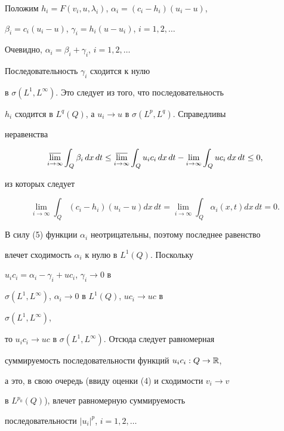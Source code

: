 


\begin{pf} 


Положим $h_i=F(v_i,u,\lambda_i)$, $\alpha_i=(c_i-h_i)(u_i-u)$, 


$\beta_i=c_i(u_i-u)$, $\gamma_i=h_i(u-u_i)$, $i=1,2,\dotsc$ 


Очевидно, $\alpha_i=\beta_i+\gamma_i$, $i=1,2,\dotsc$ 


Последовательность $\gamma_i$ сходится к нулю 


в $\sigma(L^1,L^\infty)$. Это следует из того, что последовательность 


$h_i$ сходится в $L^q(Q)$, а $u_i\to u$ в $\sigma(L^p,L^q)$. Справедливы 


неравенства 


$$ 


\underset{i\to\infty}{\varlimsup}\int_Q \beta_i\,d x\,d t\le 


\underset{i\to\infty}{\varlimsup}\int_Q 


u_i c_i\,d x\, d t-\lim_{i\to\infty}\int_Q u c_i\,d x\,d t\le0, 


$$ 


из которых следует 


$$ 


\lim_{i\to\infty}\int_Q (c_i-h_i)(u_i-u)d x\,d t= 


\lim_{i\to\infty}\int_Q \alpha_i(x,t)d x\,d t=0. 


$$ 


В силу (5) функции $\alpha_i$ неотрицательны, поэтому последнее равенство 


влечет сходимость $\alpha_i$ к нулю в $L^1(Q)$. Поскольку 


$u_i c_i=\alpha_i-\gamma_i+u c_i$, $\gamma_i\to0$ в 


$\sigma(L^1,L^\infty)$, $\alpha_i\to0$ в $L^1(Q)$, $u c_i\to u c$ в 


$\sigma(L^1,L^\infty)$, 


то $u_i c_i\to u c$ в $\sigma(L^1,L^\infty)$. Отсюда следует равномерная 


суммируемость последовательности функций $u_i c_i:Q\to\Bbb R$, 


а это, в свою очередь (ввиду оценки (4) и сходимости $v_i\to v$ 


в $L^{p_0}(Q)$), влечет равномерную суммируемость 


последовательности $|u_i|^p$, $i=1,2,\dotsc$ 


 



\end{pf}
